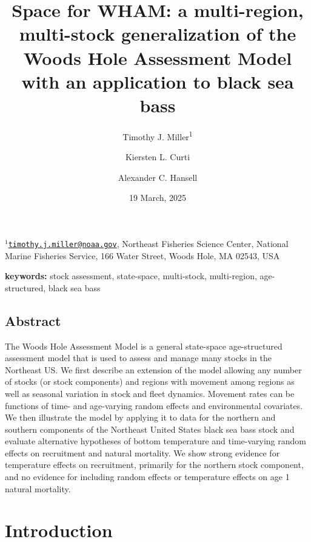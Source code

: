 \documentclass[
]{article}
\title{Space for WHAM: a multi-region, multi-stock generalization of the Woods Hole Assessment Model with an application to black sea bass}
\author{Timothy J. Miller\textsuperscript{1} \and Kiersten L. Curti \and Alexander C. Hansell}
\date{19 March, 2025}
\begin{document}
\maketitle

\(^1\)\href{mailto:timothy.j.miller@noaa.gov}{\nolinkurl{timothy.j.miller@noaa.gov}}, Northeast Fisheries Science Center, National Marine Fisheries Service, 166 Water Street, Woods Hole, MA 02543, USA\\

\pagebreak

\textbf{keywords:} stock assessment, state-space, multi-stock, multi-region, age-structured, black sea bass

\hypertarget{abstract}{%
\subsection*{Abstract}\label{abstract}}

The Woods Hole Assessment Model is a general state-space age-structured assessment model that is used to assess and manage many stocks in the Northeast US. We first describe an extension of the model allowing any number of stocks (or stock components) and regions with movement among regions as well as seasonal variation in stock and fleet dynamics. Movement rates can be functions of time- and age-varying random effects and environmental covariates. We then illustrate the model by applying it to data for the northern and southern components of the Northeast United States black sea bass stock and evaluate alternative hypotheses of bottom temperature and time-varying random effects on recruitment and natural mortality. We show strong evidence for temperature effects on recruitment, primarily for the northern stock component, and no evidence for including random effects or temperature effects on age 1 natural mortality.

\pagebreak

\hypertarget{introduction}{%
\section*{Introduction}\label{introduction}}
\end{document}
